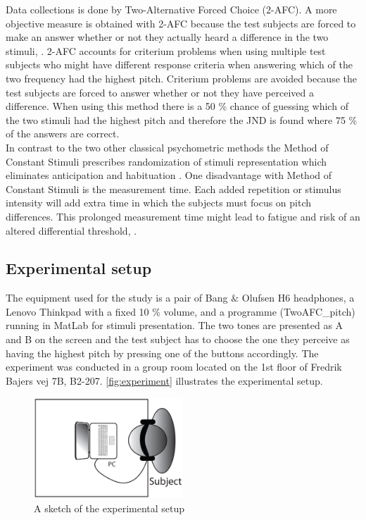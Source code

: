 Data collections is done by Two-Alternative Forced Choice (2-AFC). A more objective measure is obtained with 2-AFC because the test subjects are forced to make an answer whether or not they actually heard a difference in the two stimuli, \citep[p. 1219]{Ehrenstein1999}. 2-AFC accounts for criterium problems when using multiple test subjects who might have different response criteria when answering which of the two frequency had the highest pitch. Criterium problems are avoided because the test subjects are forced to answer whether or not they have perceived a difference. When using this method there is a 50 \% chance of guessing which of the two stimuli had the highest pitch and therefore the JND is found where 75 \% of the answers are correct.\\[5mm]
%
In contrast to the two other classical psychometric methods the Method of Constant Stimuli prescribes randomization of stimuli representation which eliminates anticipation and habituation \citep[p. 15]{Poulsen2005}. One disadvantage with Method of Constant Stimuli is the measurement time. Each added repetition or stimulus intensity will add extra time in which the subjects must focus on pitch differences. This prolonged measurement time might lead to fatigue and risk of an altered differential threshold, \citep[p. 16]{Poulsen2005}. 
%

\subsection*{Experimental setup}
%
The equipment used for the study is a pair of Bang $\&$ Olufsen H6 headphones, a Lenovo Thinkpad with a fixed 10 \% volume, and a programme (TwoAFC\_pitch) running in MatLab for stimuli presentation. The two tones are presented as A and B on the screen and the test subject has to choose the one they perceive as having the highest pitch by pressing one of the buttons accordingly. The experiment was conducted in a group room located on the 1st floor of Fredrik Bajers vej 7B, B2-207. \autoref{fig:experiment} illustrates the experimental setup.
%
\begin{figure}[H]
\centering
\includegraphics[width = 0.5\textwidth]{Figure/Vores_Figurer/experiment.png} 
\caption{A sketch of the experimental setup}
\label{fig:experiment}
\end{figure}
%

